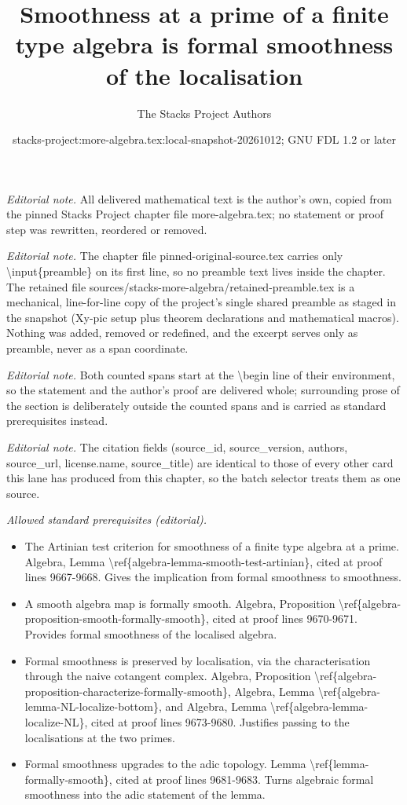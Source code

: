 \documentclass[10pt,a4paper]{amsart}
\title{Smoothness at a prime of a finite type algebra is formal smoothness of the localisation}
\author{The Stacks Project Authors}
\date{stacks-project:more-algebra.tex:local-snapshot-20261012; GNU FDL 1.2 or later}
\theoremstyle{plain}
\theoremstyle{definition}
\theoremstyle{remark}
\numberwithin{equation}{subsection}
\begin{document}
\maketitle
\setcounter{subsection}{1}
\noindent\textit{Editorial note.} All delivered mathematical text is the author's own, copied from the pinned Stacks Project chapter file more-algebra.tex; no statement or proof step was rewritten, reordered or removed.\par\medskip
\noindent\textit{Editorial note.} The chapter file pinned-original-source.tex carries only \textbackslash{}input\{preamble\} on its first line, so no preamble text lives inside the chapter. The retained file sources/stacks-more-algebra/retained-preamble.tex is a mechanical, line-for-line copy of the project's single shared preamble as staged in the snapshot (Xy-pic setup plus theorem declarations and mathematical macros). Nothing was added, removed or redefined, and the excerpt serves only as preamble, never as a span coordinate.\par\medskip
\noindent\textit{Editorial note.} Both counted spans start at the \textbackslash{}begin line of their environment, so the statement and the author's proof are delivered whole; surrounding prose of the section is deliberately outside the counted spans and is carried as standard prerequisites instead.\par\medskip
\noindent\textit{Editorial note.} The citation fields (source\_id, source\_version, authors, source\_url, license.name, source\_title) are identical to those of every other card this lane has produced from this chapter, so the batch selector treats them as one source.\par\medskip
\noindent\textit{Allowed standard prerequisites (editorial).}\begin{itemize}
\item The Artinian test criterion for smoothness of a finite type algebra at a prime. Algebra, Lemma \textbackslash{}ref\{algebra-lemma-smooth-test-artinian\}, cited at proof lines 9667-9668. Gives the implication from formal smoothness to smoothness.
\item A smooth algebra map is formally smooth. Algebra, Proposition \textbackslash{}ref\{algebra-proposition-smooth-formally-smooth\}, cited at proof lines 9670-9671. Provides formal smoothness of the localised algebra.
\item Formal smoothness is preserved by localisation, via the characterisation through the naive cotangent complex. Algebra, Proposition \textbackslash{}ref\{algebra-proposition-characterize-formally-smooth\}, Algebra, Lemma \textbackslash{}ref\{algebra-lemma-NL-localize-bottom\}, and Algebra, Lemma \textbackslash{}ref\{algebra-lemma-localize-NL\}, cited at proof lines 9673-9680. Justifies passing to the localisations at the two primes.
\item Formal smoothness upgrades to the adic topology. Lemma \textbackslash{}ref\{lemma-formally-smooth\}, cited at proof lines 9681-9683. Turns algebraic formal smoothness into the adic statement of the lemma.
\end{itemize}\medskip
\end{document}
